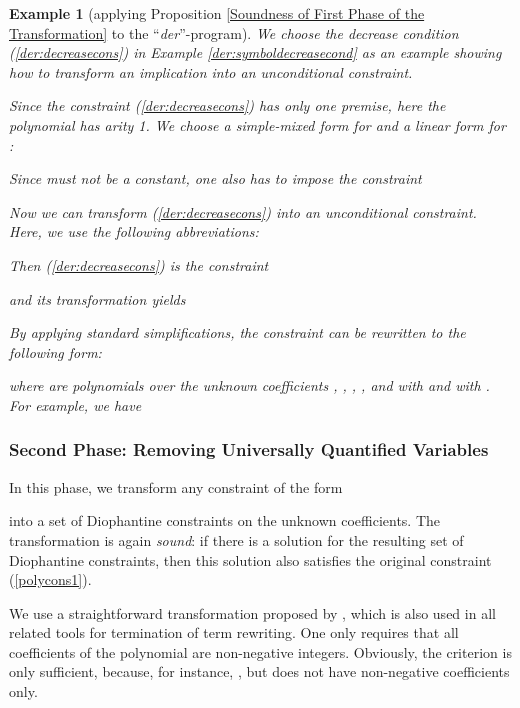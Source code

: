 \documentclass[envcountsame]{tlp}
\newcounter{polycons2ctr}
\newcounter{auxctr}
\newcounter{polycons1ctr}
\newcounter{ex:der-lastsymconsctr}
\newtheorem{example}{Example}
\begin{document}
\begin{example}[applying Proposition \ref{Soundness of First Phase of the
Transformation} to the  ``\textit{der}''-program] 
\label{ex-der:sym_cons} 
We choose the decrease
condition (\ref{der:decreasecons})
in Example \ref{der:symboldecreasecond}
as an example showing how
to transform an implication 
into an unconditional constraint. 

Since the constraint (\ref{der:decreasecons}) has only one premise, here the
polynomial  has arity 1. We
choose a simple-mixed form for  and a linear form for 
:

Since  must not be a constant, one also has to impose the constraint
            

Now we can transform (\ref{der:decreasecons})  into an unconditional
constraint. Here, we use the following abbreviations:

Then  (\ref{der:decreasecons}) is the constraint

and its transformation yields

By applying standard simplifications, the constraint can be rewritten to  
the following form:
\setcounter{ex:der-lastsymconsctr}{\value{equation}}

where  are 
polynomials over the unknown coefficients
, , , , and
 with  and  with .
For example, we have

\hfill{}
\end{example}
\subsubsection{Second Phase: Removing Universally Quantified Variables}\label{poly-inter-generating}\hspace*{\fill}

\vspace*{.2cm}

\noindent
In this phase, we transform any constraint of the form
\setcounter{auxctr}{\value{equation}}
\setcounter{equation}{\value{polycons1ctr}}
 
into a set of Diophantine
constraints on the unknown coefficients. 
The transformation is again \emph{sound}:
if
there is a solution for the resulting set of Diophantine constraints,
then 
this solution also satisfies 
the original constraint (\ref{polycons1}).
\setcounter{equation}{\value{auxctr}}

We use a straightforward transformation proposed by \cite{Hongetal98}, which
is also  used in all
related 
tools for termination of term rewriting. One only requires that all
coefficients of the polynomial  are non-negative integers. Obviously, the criterion
is only sufficient, because, for instance,
, but  does not have non-negative
coefficients only.
\end{document}
